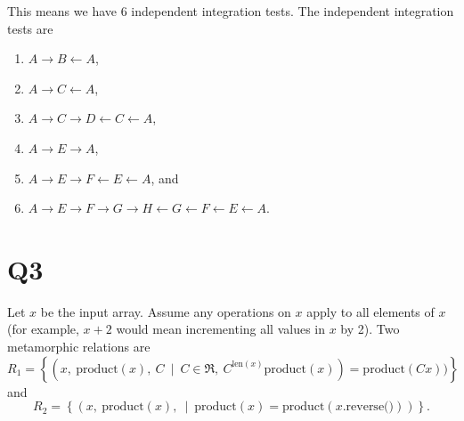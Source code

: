 \documentclass[12pt, letterpaper, titlepage]{article}
\begin{document}
This means we have 6 independent integration tests. The independent integration tests are
\begin{enumerate}
    \item $A \longrightarrow B \longleftarrow A$,
    \item $A \longrightarrow C \longleftarrow A$,
    \item $A \longrightarrow C \longrightarrow D \longleftarrow C \longleftarrow A$,
    \item $A \longrightarrow E \longrightarrow A$,
    \item $A \longrightarrow E \longrightarrow F \longleftarrow E \longleftarrow A$, and
    \item $A \longrightarrow E \longrightarrow F \longrightarrow G \longrightarrow H \longleftarrow G \longleftarrow F \longleftarrow E \longleftarrow A$.
\end{enumerate}

\section*{Q3}
Let $x$ be the input array. Assume any operations on $x$ apply to all elements of $x$ (for example, $x + 2$ would mean incrementing all values in $x$ by 2). Two metamorphic relations are
\begin{equation}
    R_1 = \left\lbrace( 
        x,\ \text{product}(x),\ C\
        \mid\
        C \in \Re,\ C^{\text{len}(x)}\text{product}(x)) = \text{product}(Cx)
    )\right\rbrace
\end{equation}
and
\begin{equation}
    R_2 = \left\lbrace( 
        x,\ \text{product}(x),\
        \mid\
        \text{product}(x) = \text{product}(x\text{.reverse()})
    )\right\rbrace.
\end{equation}

\end{document}
